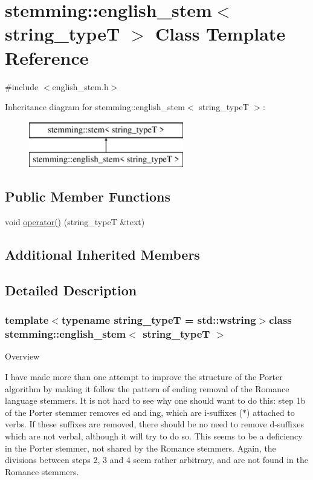 \hypertarget{classstemming_1_1english__stem}{\section{stemming\-:\-:english\-\_\-stem$<$ string\-\_\-type\-T $>$ Class Template Reference}
\label{classstemming_1_1english__stem}
}


{\ttfamily \#include $<$english\-\_\-stem.\-h$>$}

Inheritance diagram for stemming\-:\-:english\-\_\-stem$<$ string\-\_\-type\-T $>$\-:\begin{figure}[H]
\begin{center}
\leavevmode
\includegraphics[height=2.000000cm]{classstemming_1_1english__stem}
\end{center}
\end{figure}
\subsection*{Public Member Functions}
\begin{DoxyCompactItemize}
\item 
void \hyperlink{classstemming_1_1english__stem_a8163a8cc4186b749665d616cbf11c492}{operator()} (string\-\_\-type\-T \&text)
\end{DoxyCompactItemize}
\subsection*{Additional Inherited Members}


\subsection{Detailed Description}
\subsubsection*{template$<$typename string\-\_\-type\-T = std\-::wstring$>$class stemming\-::english\-\_\-stem$<$ string\-\_\-type\-T $>$}

Overview

I have made more than one attempt to improve the structure of the Porter algorithm by making it follow the pattern of ending removal of the Romance language stemmers. It is not hard to see why one should want to do this\-: step 1b of the Porter stemmer removes ed and ing, which are i-\/suffixes ($\ast$) attached to verbs. If these suffixes are removed, there should be no need to remove d-\/suffixes which are not verbal, although it will try to do so. This seems to be a deficiency in the Porter stemmer, not shared by the Romance stemmers. Again, the divisions between steps 2, 3 and 4 seem rather arbitrary, and are not found in the Romance stemmers.

